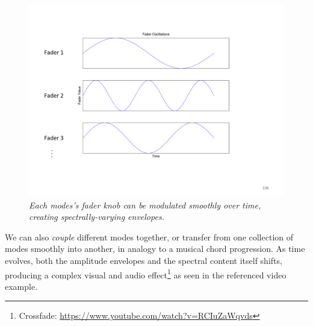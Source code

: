 \begin{figure}
	\centering
	\includegraphics[width=\textwidth]{chap6/figures/fader_envelopes.png}
	\caption{\em Each modes's fader knob can be modulated smoothly over time, creating spectrally-varying envelopes.}
\label{fig:fader_envs}
\end{figure}

We can also {\em couple} different modes together, or transfer from one collection of modes smoothly into another, in analogy to a musical chord progression. As time evolves, both the amplitude envelopes and the
spectral content itself shifts, producing a complex visual and audio effect\footnote{Crossfade: \url{https://www.youtube.com/watch?v=RCIuZaWqvds}} as seen in the referenced video example.



